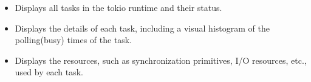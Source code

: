 \documentclass{software_engineer_rustin_liu}
\newcommand{\en}[1]{#1}
\newcommand{\zh}[1]{}
\begin{document}
\begin{itemize}
      \item \en{Displays all tasks in the tokio runtime and their status.}
            \zh{显示 tokio runtime 中的所有任务及其状态。}
      \item \en{Displays the details of each task, including a visual histogram of the polling(busy) times of the task.}
            \zh{显示每个任务的详细信息，包括任务的轮询（忙碌）时间的柱状图。}
      \item \en{Displays the resources, such as synchronization primitives, I/O resources, etc., used by each task.}
            \zh{显示每个任务使用的资源，如同步原语、I/O 资源等。}
\end{itemize}


\en{}
\zh{\datedsubsection{\textbf{Rustup(Rust) - 前维护者}}{{\href{https://github.com/rust-lang/rustup/commits?author=Rustin170506}{110+ commits}}}}

\en{}
\zh{\datedsubsection{\textbf{Ant Design(TypeScript) - 前维护者}}{{\href{https://github.com/ant-design/ant-design/commits?author=Rustin170506}{20+ commits}}}}
\end{document}
